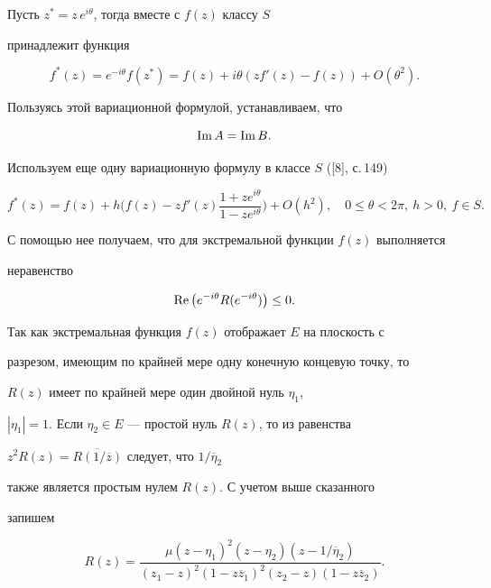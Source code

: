 Пусть $z^*=z\,e^{i\theta}$, тогда вместе с $f(z)$ классу $S$


принадлежит функция


$$


f^*(z)=e^{-i\theta}f(z^*)=f(z) + i\theta(zf'(z)-f(z)) + O(\theta^2).


$$


Пользуясь этой вариационной формулой, устанавливаем, что


\begin{equation}


\im A=\im B.


\end{equation}


Используем еще одну вариационную формулу в классе $S$ ([8], с.\,149)


$$


f^*(z)=f(z) + h\biggl( f(z)-zf'(z)


\frac {1 + ze^{i\theta}}{1-ze^{i\theta}}


\biggr) + O(h^2),\quad 0 \le\theta< 2\pi, \ h > 0, \ f\in S.


$$


С помощью нее получаем, что для экстремальной функции $f(z)$ выполняется


неравенство


\begin{equation}


\re \left(e^{-i\theta}R(e^{-i\theta})\right) \le 0.


\end{equation}


Так как экстремальная функция $f(z)$ отображает $E$ на плоскость с


разрезом, имеющим по крайней мере одну конечную концевую точку, то


$R(z)$ имеет по крайней мере один двойной нуль $\eta_1$,


$|\eta_1|=1$. Если $\eta_2 \in E$ --- простой нуль $R(z)$, то из равенства


$z^2R(z)=\overline {R(1/\overline z)}$ следует, что $1/\overline\eta_2$


также является простым нулем $R(z)$. С учетом выше сказанного


запишем


$$


R(z) =\frac {\mu(z-\eta_1)^2(z-\eta_2)(z- 1/\overline\eta_2)}


{(z_1-z)^2(1-z\overline z_1)^2(z_2-z)(1-z\overline z_2)}.


$$


